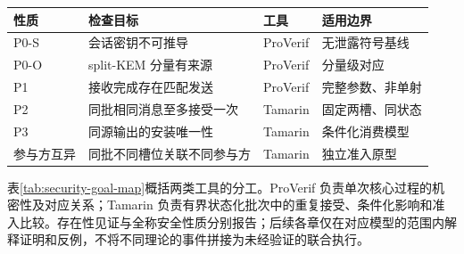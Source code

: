 \begin{center}
\begin{minipage}{\linewidth}
\centering
{}
\label{tab:security-goal-map}
\small
\begin{tabularx}{\linewidth}{@{}lYlY@{}}
\toprule
性质 & 检查目标 & 工具 & 适用边界\\
\midrule
P0-S & 会话密钥不可推导 & ProVerif & 无泄露符号基线\\
P0-O & split-KEM 分量有来源 & ProVerif & 分量级对应\\
P1 & 接收完成存在匹配发送 & ProVerif & 完整参数、非单射\\
P2 & 同批相同消息至多接受一次 & Tamarin & 固定两槽、同状态\\
P3 & 同源输出的安装唯一性 & Tamarin & 条件化消费模型\\
参与方互异 & 同批不同槽位关联不同参与方 & Tamarin & 独立准入原型\\
\bottomrule
\end{tabularx}
\end{minipage}
\end{center}

表\ref{tab:security-goal-map}概括两类工具的分工。ProVerif 负责单次核心过程的机密性及对应关系；Tamarin 负责有界状态化批次中的重复接受、条件化影响和准入比较。存在性见证与全称安全性质分别报告；后续各章仅在对应模型的范围内解释证明和反例，不将不同理论的事件拼接为未经验证的联合执行。
